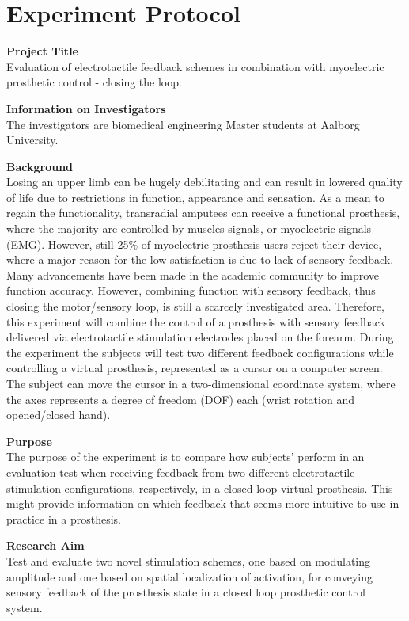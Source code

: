 \section{Experiment Protocol}

\textbf{Project Title} \\
Evaluation of electrotactile feedback schemes in combination with myoelectric prosthetic control - closing the loop. 

\textbf{Information on Investigators} \\
The investigators are biomedical engineering Master students at Aalborg University. 

\textbf{Background} \\
Losing an upper limb can be hugely debilitating and can result in lowered quality of life due to restrictions in function, appearance and sensation. As a mean to regain the functionality, transradial amputees can receive a functional prosthesis, where the majority are controlled by muscles signals, or myoelectric signals (EMG). However, still 25\% of myoelectric prosthesis users reject their device, where a major reason for the low satisfaction is due to lack of sensory feedback.
Many advancements have been made in the academic community to improve function accuracy. However, combining function with sensory feedback, thus closing the motor/sensory loop, is still a scarcely investigated area. Therefore, this experiment will combine the control of a prosthesis with sensory feedback delivered via electrotactile stimulation electrodes placed on the forearm. During the experiment the subjects will test two different feedback configurations while controlling a virtual prosthesis, represented as a cursor on a computer screen. The subject can move the cursor in a two-dimensional coordinate system, where the axes represents a degree of freedom (DOF) each (wrist rotation and opened/closed hand).

\textbf{Purpose} \\
The purpose of the experiment is to compare how subjects' perform in an evaluation test when receiving feedback from two different electrotactile stimulation configurations, respectively, in a closed loop virtual prosthesis. This might provide information on which feedback that seems more intuitive to use in practice in a prosthesis.

\textbf{Research Aim} \\
Test and evaluate two novel stimulation schemes, one based on modulating amplitude and one based on spatial localization of activation, for conveying sensory feedback of the prosthesis state in a closed loop prosthetic control system.

